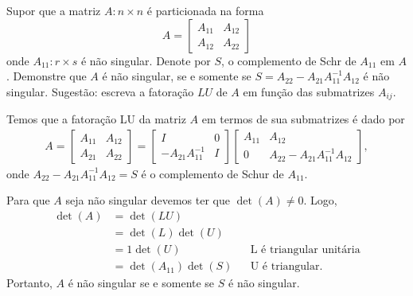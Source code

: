 \begin{questions}
    \question Supor que a matriz $A : n \times n$ \'{e} particionada na forma
    \[
    A = \begin{bmatrix}
        A_{11} & A_{12} \\
        A_{12} & A_{22}
    \end{bmatrix}
    \]
    onde $A_{11} : r \times s$ \'{e} n\~{a}o singular. Denote por $S$, o complemento de Schr de $A_{11}$ em $A$. Demonstre que $A$ \'{e} n\~{a}o singular, se e somente se $S = A_{22} - A_{21} A_{11}^{-1} A_{12}$ \'{e} n\~{a}o singular. Sugest\~{a}o: escreva a fatora\c{c}\~{a}o $LU$ de $A$ em fun\c{c}\~{a}o das submatrizes $A_{ij}$.
    \begin{solution}
        Temos que a fatora\c{c}\~{a}o LU da matriz $A$ em termos de sua submatrizes \'{e} dado por
        \begin{align*}
            A = \begin{bmatrix}
                A_{11} & A_{12} \\
                A_{21} & A_{22}
            \end{bmatrix} = \begin{bmatrix}
                I & 0 \\
                -A_{21} A_{11}^{-1} & I
            \end{bmatrix} \begin{bmatrix}
                A_{11} & A_{12} \\
                0 & A_{22} - A_{21} A_{11}^{-1} A_{12}
            \end{bmatrix},
        \end{align*}
        onde $A_{22} - A_{21} A_{11}^{-1} A_{12} = S$ \'{e} o complemento de Schur de $A_{11}$.

        Para que $A$ seja n\~{a}o singular devemos ter que $\det(A) \neq 0$. Logo,
        \begin{align*}
            \det(A) &= \det(L U) \\
            &= \det(L) \det(U) \\
            &= 1 \det(U) && \text{L \'{e} triangular unit\'{a}ria} \\
            &= \det(A_{11}) \det(S) && \text{U \'{e} triangular}.
        \end{align*}
        Portanto, $A$ \'{e} n\~{a}o singular se e somente se $S$ \'{e} n\~{a}o singular.
    \end{solution}


\end{questions}
